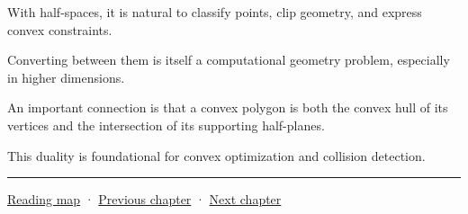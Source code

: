 With half-spaces, it is natural to classify points, clip geometry, and express convex constraints.

Converting between them is itself a computational geometry problem, especially in higher dimensions.

An important connection is that a convex polygon is both the convex hull of its vertices and the intersection of its supporting half-planes.

This duality is foundational for convex optimization and collision detection.

\begin{center}\rule{0.5\linewidth}{0.5pt}\end{center}

\hyperref[volume-reading-map]{Reading map} · \hyperref[03-visual-computing-i-ch020-geometry-queries-from-scene-to-contact]{Previous chapter} · \hyperref[04-visual-computing-ii-ch022-convex-support-mapping-and-distance]{Next chapter}
